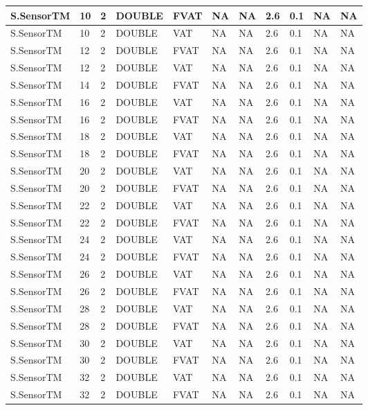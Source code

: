 {\begin{longtable}{|l|l|l|l|l|l|l|l|l|l|l|}
S.SensorTM & 10 & 2 & DOUBLE & FVAT & NA & NA & 2.6 & 0.1 & NA & NA \\ \hline
S.SensorTM & 10 & 2 & DOUBLE & VAT & NA & NA & 2.6 & 0.1 & NA & NA \\ \hline
S.SensorTM & 12 & 2 & DOUBLE & FVAT & NA & NA & 2.6 & 0.1 & NA & NA \\ \hline
S.SensorTM & 12 & 2 & DOUBLE & VAT & NA & NA & 2.6 & 0.1 & NA & NA \\ \hline
S.SensorTM & 14 & 2 & DOUBLE & FVAT & NA & NA & 2.6 & 0.1 & NA & NA \\ \hline
S.SensorTM & 16 & 2 & DOUBLE & VAT & NA & NA & 2.6 & 0.1 & NA & NA \\ \hline
S.SensorTM & 16 & 2 & DOUBLE & FVAT & NA & NA & 2.6 & 0.1 & NA & NA \\ \hline
S.SensorTM & 18 & 2 & DOUBLE & VAT & NA & NA & 2.6 & 0.1 & NA & NA \\ \hline
S.SensorTM & 18 & 2 & DOUBLE & FVAT & NA & NA & 2.6 & 0.1 & NA & NA \\ \hline
S.SensorTM & 20 & 2 & DOUBLE & VAT & NA & NA & 2.6 & 0.1 & NA & NA \\ \hline
S.SensorTM & 20 & 2 & DOUBLE & FVAT & NA & NA & 2.6 & 0.1 & NA & NA \\ \hline
S.SensorTM & 22 & 2 & DOUBLE & VAT & NA & NA & 2.6 & 0.1 & NA & NA \\ \hline
S.SensorTM & 22 & 2 & DOUBLE & FVAT & NA & NA & 2.6 & 0.1 & NA & NA \\ \hline
S.SensorTM & 24 & 2 & DOUBLE & VAT & NA & NA & 2.6 & 0.1 & NA & NA \\ \hline
S.SensorTM & 24 & 2 & DOUBLE & FVAT & NA & NA & 2.6 & 0.1 & NA & NA \\ \hline
S.SensorTM & 26 & 2 & DOUBLE & VAT & NA & NA & 2.6 & 0.1 & NA & NA \\ \hline
S.SensorTM & 26 & 2 & DOUBLE & FVAT & NA & NA & 2.6 & 0.1 & NA & NA \\ \hline
S.SensorTM & 28 & 2 & DOUBLE & VAT & NA & NA & 2.6 & 0.1 & NA & NA \\ \hline
S.SensorTM & 28 & 2 & DOUBLE & FVAT & NA & NA & 2.6 & 0.1 & NA & NA \\ \hline
S.SensorTM & 30 & 2 & DOUBLE & VAT & NA & NA & 2.6 & 0.1 & NA & NA \\ \hline
S.SensorTM & 30 & 2 & DOUBLE & FVAT & NA & NA & 2.6 & 0.1 & NA & NA \\ \hline
S.SensorTM & 32 & 2 & DOUBLE & VAT & NA & NA & 2.6 & 0.1 & NA & NA \\ \hline
S.SensorTM & 32 & 2 & DOUBLE & FVAT & NA & NA & 2.6 & 0.1 & NA & NA \\ \hline

\end{longtable}}
